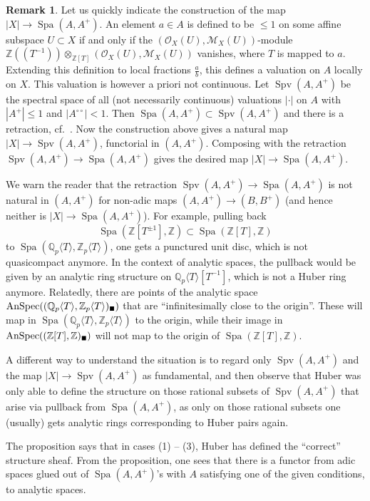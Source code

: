 \documentclass[11pt]{amsbook}
\DeclareMathOperator{\Spa}{Spa}
\DeclareMathOperator{\Spv}{Spv}
\DeclareMathOperator{\AnSpec}{AnSpec}
\newcommand{\solid}{{\mathsmaller{\blacksquare}}}
\numberwithin{equation}{section}
\numberwithin{theorem}{section}
\theoremstyle{definition}
\newtheorem{remark}[theorem]{Remark}
\begin{document}
\begin{remark} Let us quickly indicate the construction of the map $|X|\to \Spa(A,A^+)$. An element $a\in A$ is defined to be $\leq 1$ on some affine subspace $U\subset X$ if and only if the $(\mathcal O_X(U),\mathcal M_X(U))$-module $\mathbb Z((T^{-1}))\otimes_{\mathbb Z[T]} (\mathcal O_X(U),\mathcal M_X(U))$ vanishes, where $T$ is mapped to $a$. Extending this definition to local fractions $\frac ab$, this defines a valuation on $A$ locally on $X$. This valuation is however a priori not continuous. Let $\Spv(A,A^+)$ be the spectral space of all (not necessarily continuous) valuations $|\cdot|$ on $A$ with $|A^+|\leq 1$ and $|A^{\circ\circ}|<1$. Then $\Spa(A,A^+)\subset \Spv(A,A^+)$ and there is a retraction, cf.~\cite[Proposition 2.6, Theorem 3.1]{HuberContVal}. Now the construction above gives a natural map $|X|\to \Spv(A,A^+)$, functorial in $(A,A^+)$. Composing with the retraction $\Spv(A,A^+)\to \Spa(A,A^+)$ gives the desired map $|X|\to \Spa(A,A^+)$.

We warn the reader that the retraction $\Spv(A,A^+)\to \Spa(A,A^+)$ is not natural in $(A,A^+)$ for non-adic maps $(A,A^+)\to (B,B^+)$ (and hence neither is $|X|\to \Spa(A,A^+)$). For example, pulling back
\[
\Spa(\mathbb Z[T^{\pm 1}],\mathbb Z)\subset \Spa(\mathbb Z[T],\mathbb Z)
\]
to $\Spa(\mathbb Q_p\langle T\rangle,\mathbb Z_p\langle T\rangle)$, one gets a punctured unit disc, which is not quasicompact anymore. In the context of analytic spaces, the pullback would be given by an analytic ring structure on $\mathbb Q_p\langle T\rangle[T^{-1}]$, which is not a Huber ring anymore. Relatedly, there are points of the analytic space $\AnSpec((\mathbb Q_p\langle T\rangle,\mathbb Z_p\langle T\rangle)_\solid)$ that are ``infinitesimally close to the origin''. These will map in $\Spa(\mathbb Q_p\langle T\rangle,\mathbb Z_p\langle T\rangle)$ to the origin, while their image in $\AnSpec((\mathbb Z[T],\mathbb Z)_\solid)$ will not map to the origin of $\Spa(\mathbb Z[T],\mathbb Z)$.

A different way to understand the situation is to regard only $\Spv(A,A^+)$ and the map $|X|\to \Spv(A,A^+)$ as fundamental, and then observe that Huber was only able to define the structure on those rational subsets of $\Spv(A,A^+)$ that arise via pullback from $\Spa(A,A^+)$, as only on those rational subsets one (usually) gets analytic rings corresponding to Huber pairs again.
\end{remark}

The proposition says that in cases (1) -- (3), Huber has defined the ``correct'' structure sheaf. From the proposition, one sees that there is a functor from adic spaces glued out of $\Spa(A,A^+)$'s with $A$ satisfying one of the given conditions, to analytic spaces.
\end{document}
